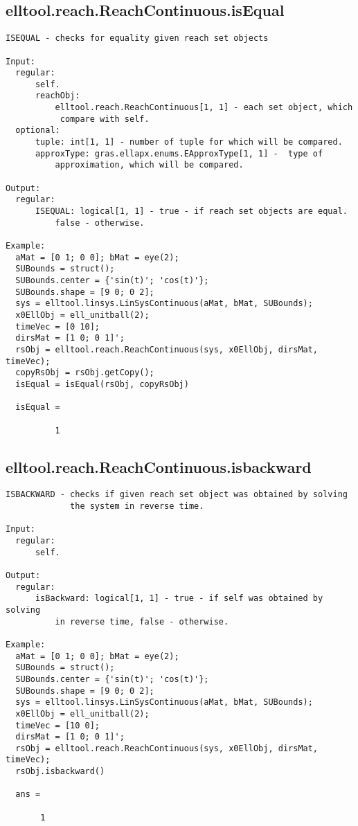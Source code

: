 \subsection{\texorpdfstring{elltool.reach.ReachContinuous.isEqual}{isEqual}}\label{method:elltool.reach.ReachContinuous.isEqual}
\begin{verbatim}
ISEQUAL - checks for equality given reach set objects

Input:
  regular:
      self.
      reachObj:
          elltool.reach.ReachContinuous[1, 1] - each set object, which
           compare with self.
  optional:
      tuple: int[1, 1] - number of tuple for which will be compared.
      approxType: gras.ellapx.enums.EApproxType[1, 1] -  type of
          approximation, which will be compared.

Output:
  regular:
      ISEQUAL: logical[1, 1] - true - if reach set objects are equal.
          false - otherwise.

Example:
  aMat = [0 1; 0 0]; bMat = eye(2);
  SUBounds = struct();
  SUBounds.center = {'sin(t)'; 'cos(t)'};
  SUBounds.shape = [9 0; 0 2];
  sys = elltool.linsys.LinSysContinuous(aMat, bMat, SUBounds);
  x0EllObj = ell_unitball(2);
  timeVec = [0 10];
  dirsMat = [1 0; 0 1]';
  rsObj = elltool.reach.ReachContinuous(sys, x0EllObj, dirsMat, timeVec);
  copyRsObj = rsObj.getCopy();
  isEqual = isEqual(rsObj, copyRsObj)

  isEqual =

          1
\end{verbatim}
\subsection{\texorpdfstring{elltool.reach.ReachContinuous.isbackward}{isbackward}}\label{method:elltool.reach.ReachContinuous.isbackward}
\begin{verbatim}
ISBACKWARD - checks if given reach set object was obtained by solving
             the system in reverse time.

Input:
  regular:
      self.

Output:
  regular:
      isBackward: logical[1, 1] - true - if self was obtained by solving
          in reverse time, false - otherwise.

Example:
  aMat = [0 1; 0 0]; bMat = eye(2);
  SUBounds = struct();
  SUBounds.center = {'sin(t)'; 'cos(t)'};
  SUBounds.shape = [9 0; 0 2];
  sys = elltool.linsys.LinSysContinuous(aMat, bMat, SUBounds);
  x0EllObj = ell_unitball(2);
  timeVec = [10 0];
  dirsMat = [1 0; 0 1]';
  rsObj = elltool.reach.ReachContinuous(sys, x0EllObj, dirsMat, timeVec);
  rsObj.isbackward()

  ans =

       1
\end{verbatim}
